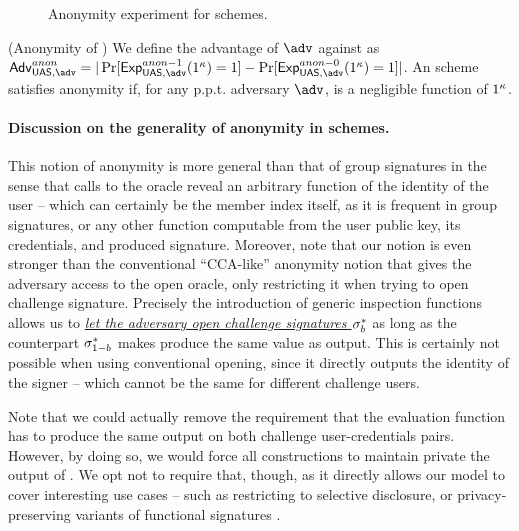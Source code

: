 \begin{figure}[htp!]
  \caption{Anonymity experiment for \UAS schemes.}
  \label{fig:exp-uas-anonb}
\end{figure}

\begin{definition}{(Anonymity of \UAS)}
  \label{def:anonymity-uas}  
  We define the advantage \AdvAnon of $\adv$ against \ExpAnonb as
  $\AdvAnon=|\Pr\lbrack\ExpAnono(1^\secpar)=1\rbrack-
  \Pr\lbrack\ExpAnonz(1^\secpar)=1\rbrack|$.
  An \UAS scheme satisfies anonymity if, for any p.p.t. adversary $\adv$,
  \AdvAnon is a negligible function of $1^\kappa$.
\end{definition}

\paragraph{Discussion on the generality of anonymity in \UAS schemes.} %
This notion of anonymity is more general than that of group signatures in the
sense that calls to the \INSPECT oracle reveal an arbitrary function of the
identity of the user -- which can certainly be the member index itself, as it
is frequent in group signatures, or any other function computable from the
user public key, its credentials, and produced signature. Moreover, note that
our notion is even stronger than the conventional ``CCA-like'' anonymity notion
that gives the adversary access to the open oracle, only restricting it when
trying to open challenge signature. Precisely the introduction of generic
inspection functions allows us to \uline{\emph{let the adversary open
    challenge signatures $\mathsf{\sigma}^*_b$}} as long as the counterpart $\mathsf{\sigma}^*_{1-b}$
makes \Inspect produce the same \y value as output. This is certainly not
possible when using conventional opening, since it directly outputs the identity
of the signer -- which cannot be the same for different challenge users.

Note that we could actually remove the requirement that the evaluation function
has to produce the same output on both challenge user-credentials pairs.
However, by doing so, we would force all constructions to maintain private the
output of \feval. We opt not to require that, though, as it directly allows
our model to cover interesting use cases -- such as restricting to selective
disclosure, or privacy-preserving variants of functional signatures .


